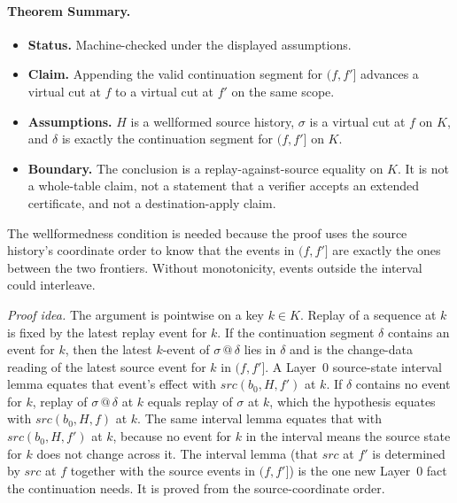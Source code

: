 \documentclass[letterpaper,10pt,twocolumn]{article}
\newcommand{\Src}{\mathit{src}}
\providecommand{\tightlist}{\setlength{\itemsep}{0pt}\setlength{\parskip}{0pt}}
\begin{document}
\paragraph*{Theorem Summary.}
\begin{itemize}
\tightlist
\item
  \textbf{Status.} Machine-checked under the displayed
  assumptions.
\item
  \textbf{Claim.} Appending the valid continuation segment for
  $(f,f']$ advances a virtual cut at $f$ to a virtual cut at $f'$ on the
  same scope.
\item
  \textbf{Assumptions.} $H$ is a wellformed source history, $\sigma$ is a
  virtual cut at $f$ on $K$, and $\delta$ is exactly the continuation
  segment for $(f,f']$ on $K$.
\item
  \textbf{Boundary.} The conclusion is a replay-against-source equality
  on $K$. It is not a whole-table claim, not a statement that a verifier
  accepts an extended certificate, and not a destination-apply claim.
\end{itemize}

The wellformedness condition is needed because the proof uses the
source history's coordinate order to know that the events in $(f,f']$
are exactly the ones between the two frontiers. Without monotonicity,
events outside the interval could interleave.

\emph{Proof idea.} The argument is pointwise on a key $k \in K$. Replay
of a sequence at $k$ is fixed by the latest replay event for $k$. If the
continuation segment $\delta$ contains an event for $k$, then the latest
$k$-event of $\sigma \mathbin{@} \delta$ lies in $\delta$ and is the
change-data reading of the latest source event for $k$ in $(f,f']$. A
Layer~0 source-state interval lemma equates that event's effect with
$\Src(b_0,H,f')$ at $k$. If $\delta$ contains no event for $k$, replay of
$\sigma \mathbin{@} \delta$ at $k$ equals replay of $\sigma$ at $k$,
which the hypothesis equates with $\Src(b_0,H,f)$ at $k$. The same interval
lemma equates that with $\Src(b_0,H,f')$ at $k$, because no event for
$k$ in the interval means the source state for $k$ does not change
across it. The interval lemma (that $\Src$ at $f'$ is determined by
$\Src$ at $f$ together with the source events in $(f,f']$) is the one
new Layer~0 fact the continuation needs. It is proved from the
source-coordinate order.
\end{document}
